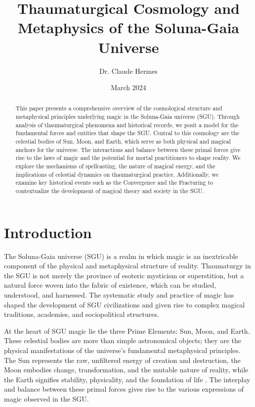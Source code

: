 \documentclass[12pt]{article}
\title{Thaumaturgical Cosmology and Metaphysics of the Soluna-Gaia Universe}
\author{Dr. Claude Hermes}
\date{March 2024}
\begin{document}
\maketitle

\begin{abstract}
This paper presents a comprehensive overview of the cosmological structure and metaphysical principles underlying magic in the Soluna-Gaia universe (SGU). Through analysis of thaumaturgical phenomena and historical records, we posit a model for the fundamental forces and entities that shape the SGU. Central to this cosmology are the celestial bodies of Sun, Moon, and Earth, which serve as both physical and magical anchors for the universe. The interactions and balance between these primal forces give rise to the laws of magic and the potential for mortal practitioners to shape reality. We explore the mechanisms of spellcasting, the nature of magical energy, and the implications of celestial dynamics on thaumaturgical practice. Additionally, we examine key historical events such as the Convergence and the Fracturing to contextualize the development of magical theory and society in the SGU. 
\end{abstract}

\section{Introduction}
The Soluna-Gaia universe (SGU) is a realm in which magic is an inextricable component of the physical and metaphysical structure of reality. Thaumaturgy in the SGU is not merely the province of esoteric mysticism or superstition, but a natural force woven into the fabric of existence, which can be studied, understood, and harnessed. The systematic study and practice of magic has shaped the development of SGU civilizations and given rise to complex magical traditions, academies, and sociopolitical structures.

At the heart of SGU magic lie the three Prime Elements: Sun, Moon, and Earth. These celestial bodies are more than simple astronomical objects; they are the physical manifestations of the universe's fundamental metaphysical principles. The Sun represents the raw, unfiltered energy of creation and destruction, the Moon embodies change, transformation, and the mutable nature of reality, while the Earth signifies stability, physicality, and the foundation of life \citep{Valdis2017}. The interplay and balance between these primal forces gives rise to the various expressions of magic observed in the SGU.
\end{document}
